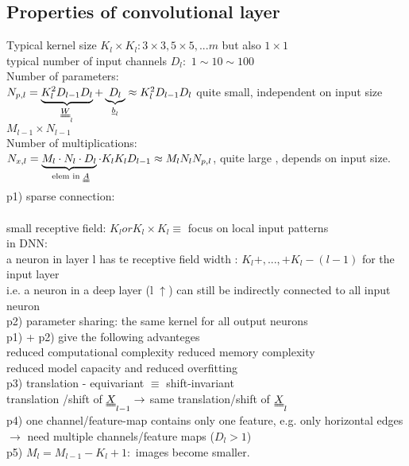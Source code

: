 \subsection{Properties of convolutional layer}
Typical kernel size $  K_l \times K_l  : 3 \times 3,  5 \times 5 , ... m $ but also $  1 \times 1  $\\
typical number of input channels $  D_l :  $ $  1 \sim 10 \sim 100  $\\
Number of parameters: \\
$ N_{p,l } =\underbrace{ K_l ^2 D_{l-1} D_l}_{\W_l} +\underbrace{ D_l}_{\b_l} \approx K_l ^2 D_{l-1 } D_l $
quite small, independent on input size $  M_{l-1} \times N_{l-1 } $\\
Number of multiplications:\\
$  N_{x,l} = \underbrace{M_l \cdot N_l \cdot D_l}_{ \text { elem in } \A}  \cdot K_l K_l D_{l-1} \approx M_l N_l N_{p,l} $, quite large , depends on input size.\\
\textbullet p1) sparse connection: \\
 \\
small receptive field: $  K_l or K_l \times K_l  \equiv $ focus on local input patterns\\
in DNN:
 \\
a neuron in layer l has te receptive field width : $  K_l +, ... ,+ K_l - (l-1) $  for the input layer\\
i.e. a neuron in a deep layer (l $  \uparrow  $) can still be indirectly connected to all input neuron \\
p2) parameter sharing: the same kernel for all output neurons \\
\textbullet p1) + p2) give the following advanteges \\
\textbullet reduced computational complexity reduced memory complexity \\
\textbullet reduced model capacity and reduced overfitting\\
\textbullet p3) translation - equivariant $  \equiv  $ shift-invariant \\
translation /shift of $  \X_{l-1} \rightarrow  $ same translation/shift of $ \X_l $\\
\textbullet p4) one channel/feature-map contains only one feature, e.g. only horizontal edges \\
$ \rightarrow $ need multiple channels/feature maps ($ D_l > 1  $) \\
\textbullet p5) $  M_l = M_{l-1 }  - K_l + 1 :  $ images become smaller.
